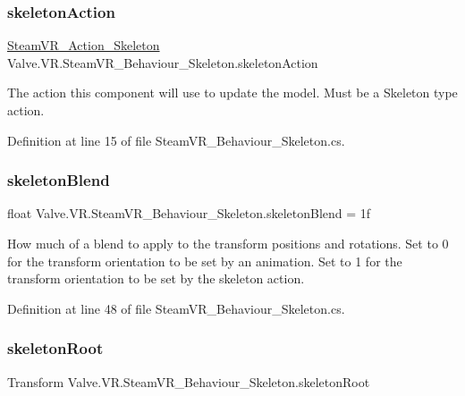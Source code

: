 \subsubsection{\texorpdfstring{skeletonAction}{skeletonAction}}
{\footnotesize\ttfamily \mbox{\hyperlink{class_valve_1_1_v_r_1_1_steam_v_r___action___skeleton}{Steam\+V\+R\+\_\+\+Action\+\_\+\+Skeleton}} Valve.\+V\+R.\+Steam\+V\+R\+\_\+\+Behaviour\+\_\+\+Skeleton.\+skeleton\+Action}



The action this component will use to update the model. Must be a Skeleton type action. 



Definition at line 15 of file Steam\+V\+R\+\_\+\+Behaviour\+\_\+\+Skeleton.\+cs.

\mbox{\label{class_valve_1_1_v_r_1_1_steam_v_r___behaviour___skeleton_afd266920dc0534d09bad29e5e5245366}} 
\subsubsection{\texorpdfstring{skeletonBlend}{skeletonBlend}}
{\footnotesize\ttfamily float Valve.\+V\+R.\+Steam\+V\+R\+\_\+\+Behaviour\+\_\+\+Skeleton.\+skeleton\+Blend = 1f}



How much of a blend to apply to the transform positions and rotations. Set to 0 for the transform orientation to be set by an animation. Set to 1 for the transform orientation to be set by the skeleton action. 



Definition at line 48 of file Steam\+V\+R\+\_\+\+Behaviour\+\_\+\+Skeleton.\+cs.

\mbox{\label{class_valve_1_1_v_r_1_1_steam_v_r___behaviour___skeleton_a6f534ee0c22238eda2d92ac44dbf2a9f}} 
\subsubsection{\texorpdfstring{skeletonRoot}{skeletonRoot}}
{\footnotesize\ttfamily Transform Valve.\+V\+R.\+Steam\+V\+R\+\_\+\+Behaviour\+\_\+\+Skeleton.\+skeleton\+Root}




